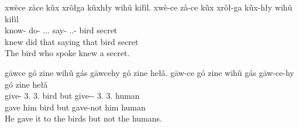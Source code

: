 \documentclass[12pt]{article}
\begin{document}
    \begin{exe}
        \ex
        xwèce zàce kũx xrôłga kũxhły wihǔ kiłìl.
        \glll
        xwè-ce zà-ce kũx xrôł-ga kũx-hły wihǔ kiłìl \\
        know-\Pst{} do-\Pst{} \Dem{}.\Anim{}.\Dist{}.\Sg{} say-\Ger{} \Dem{}.\Anim{}.\Dist{}-\Adj{} bird secret \\
        knew did that saying that bird secret \\
        \glt
        The bird who spoke knew a secret.
    \end{exe}

    \begin{exe}
        \ex
        gāwce gó zine wihǔ gás gāwcehy gó zine hełǎ.
        \glll
        gāw-ce gó zine wihǔ gás gāw-ce-hy gó zine hełǎ \\
        give-\Pst{} 3\Sg{}.\Anim{} 3\Sg{}.\Inanim{} bird but give-\Pst{}-\Neg{} 3\Sg{}.\Anim{} 3\Sg{}.\Inanim{} human \\
        gave him bird but gave-not him human \\
        \glt
        He gave it to the birds but not the humans.
    \end{exe}
\end{document}
